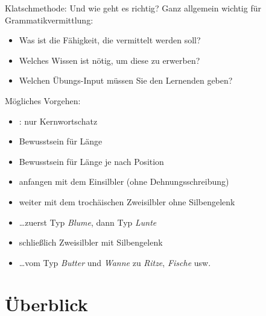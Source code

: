 \begin{frame}
  {Klatschmethode: Und wie geht es richtig?}
  \footnotesize
  \pause
   Ganz allgemein wichtig für Grammatikvermittlung:\\
  \Halbzeile 
  \pause
  \begin{itemize}[<+->]
     \item Was ist die \alert{Fähigkeit}, die vermittelt werden soll?
     \item Welches \alert{Wissen} ist nötig, um diese zu erwerben?
     \item Welchen \alert{Übungs-Input} müssen Sie den Lernenden geben?
   \end{itemize}
  \Halbzeile
  \pause
   Mögliches Vorgehen:
   \pause
   \begin{itemize}[<+->]
     \item {}: \alert{nur Kernwortschatz}
     \item \alert{Bewusstsein für Länge}
     \item Bewusstsein für \alert{Länge je nach Position}
     \item anfangen mit dem \alert{Einsilbler} (ohne Dehnungsschreibung)
     \item weiter mit dem \alert{trochäischen Zweisilbler ohne Silbengelenk}
     \item \ldots zuerst Typ \textit{Blume}, dann Typ \textit{Lunte}
     \item schließlich \alert{Zweisilbler mit Silbengelenk}
     \item \ldots vom Typ \textit{Butter} und \textit{Wanne} zu \textit{Ritze}, \textit{Fische} usw.
   \end{itemize}
\end{frame}

\section{Überblick}

